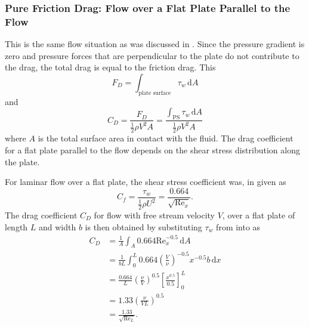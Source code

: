 \subsubsection{Pure Friction Drag: Flow over a Flat Plate Parallel to the Flow}
This is the same flow situation as was discussed in .
Since the pressure gradient is zero and pressure forces that are perpendicular to the plate do not contribute to the drag, the total drag is equal to the friction drag.
This
\begin{equation*}
  F_D = \int_{\text{plate surface}} \tau_w \, \mathrm{d}A
\end{equation*}
and
\begin{equation} \label{eq:dragflatplate}
  C_D = \frac{F_D}{\frac{1}{2}\rho V^2 A} = \frac{\int_{\mathrm{PS}} \tau_w \, \mathrm{d}A}{\frac{1}{2} \rho V^2 A}
\end{equation}
where $A$ is the total surface area in contact with the fluid.
The drag coefficient for a flat plate parallel to the flow depends on the shear stress distribution along the plate.

For laminar flow over a flat plate, the shear stress coefficient was, in  given as
\begin{equation*}
  C_f = \frac{\tau_w}{\frac{1}{2}\rho U^2} = \frac{\num{0,664} }{\sqrt{\mathrm{Re}_x}}
.\end{equation*}
The drag coefficient $C_D$ for flow with free stream velocity $V$, over a flat plate of length $L$ and width $b$ is then obtained by substituting $\tau_w$ from  into  as
\begin{align*}
    C_D &= \frac{1}{A} \int_{A} \num{0,664} \mathrm{Re}_x^{-\num{0,5} } \, \mathrm{d}A \\
    &= \frac{1}{bL} \int_{0}^{L} \num{0,664} \left( \frac{V}{\nu} \right)^{- \num{0,5} } x^{-\num{0,5} } b \, \mathrm{d}x  \\
    &= \frac{\num{0,664} }{L} \left( \frac{\nu}{V} \right)^{\num{0,5} } \left[ \frac{x^{\num{0,5} }}{\num{0,5} } \right]_{0}^{L} \\
    &= \num{1,33} \left( \frac{\nu}{VL} \right)^{\num{0,5} } \\
    &= \frac{\num{1,33} }{\sqrt{\mathrm{Re}_L}}
.\end{align*}

